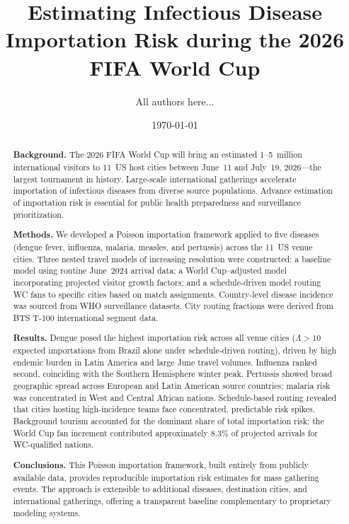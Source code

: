 \documentclass[12pt]{article}
\title{\textbf{Estimating Infectious Disease Importation Risk
during the 2026 FIFA World Cup}}
\author{All authors here...}
\date{\today}
\begin{document}
\maketitle

\begin{abstract}
\noindent\textbf{Background.}
The 2026 FIFA World Cup will bring an estimated 1--5~million
international visitors to 11~US host cities between June~11 and
July~19, 2026---the largest tournament in history. Large-scale
international gatherings accelerate importation of infectious
diseases from diverse source populations. Advance estimation of
importation risk is essential for public health preparedness and
surveillance prioritization.

\medskip
\noindent\textbf{Methods.}
We developed a Poisson importation framework applied to five
diseases (dengue fever, influenza, malaria, measles, and pertussis)
across the 11~US venue cities. Three nested travel models of
increasing resolution were constructed: a baseline model using
routine June~2024 arrival data; a World Cup--adjusted model
incorporating projected visitor growth factors; and a
schedule-driven model routing WC fans to specific cities based on
match assignments. Country-level disease incidence was sourced from
WHO surveillance datasets. City routing fractions were derived from
BTS T-100 international segment data.

\medskip
\noindent\textbf{Results.}
Dengue posed the highest importation risk across all venue cities
($\Lambda > 10$ expected importations from Brazil alone under
schedule-driven routing), driven by high endemic burden in Latin
America and large June travel volumes. Influenza ranked second,
coinciding with the Southern Hemisphere winter peak. Pertussis showed
broad geographic spread across European and Latin American source
countries; malaria risk was concentrated in West and Central African
nations. Schedule-based routing revealed that cities hosting
high-incidence teams face concentrated, predictable risk spikes.
Background tourism accounted for the dominant share of total
importation risk; the World Cup fan increment contributed
approximately 8.3\% of projected arrivals for WC-qualified nations.

\medskip
\noindent\textbf{Conclusions.}
This Poisson importation framework, built entirely from publicly
available data, provides reproducible importation risk estimates for
mass gathering events. The approach is extensible to additional
diseases, destination cities, and international gatherings, offering
a transparent baseline complementary to proprietary modeling systems.
\end{abstract}
\end{document}
